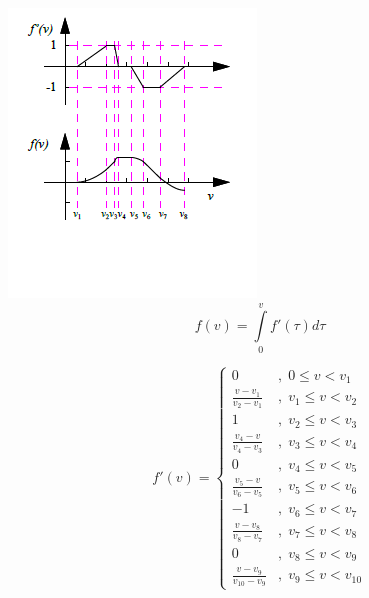 \noindent
\begin{minipage}{0.45\textwidth}
  \includegraphics[width=\textwidth]{Figures/4-Functions_LinearDerivativeFunction}
  \vspace*{-15mm}
  $$
    f(v)= \int\limits_0^v f'(\tau)d\tau
  $$
\end{minipage}%
\begin{minipage}{0.55\textwidth}
  $$
    f'(v)=\left\{\begin{array}{ll}
    0                      &,\; 0 \leq v < v_1 \\[1mm]
    \frac{v-v_1}{v_2-v_1}   &,\; v_1 \leq v < v_2 \\[1mm]
    1                      &,\; v_2 \leq v < v_3 \\[1mm]
    \frac{v_4-v}{v_4-v_3}   &,\; v_3 \leq v < v_4 \\[1mm]
    0                      &,\; v_4 \leq v < v_5 \\[1mm]
    \frac{v_5-v}{v_6-v_5}   &,\; v_5 \leq v < v_6 \\[1mm]
    -1                     &,\; v_6 \leq v < v_7 \\[1mm]
    \frac{v-v_8}{v_8-v_7}   &,\; v_7 \leq v < v_8 \\[1mm]
    0                      &,\; v_8 \leq v < v_9 \\[1mm]
    \frac{v-v_9}{v_{10}-v_9} &,\; v_9 \leq v < v_{10}
  \end{array}\right.
  $$
\end{minipage}

